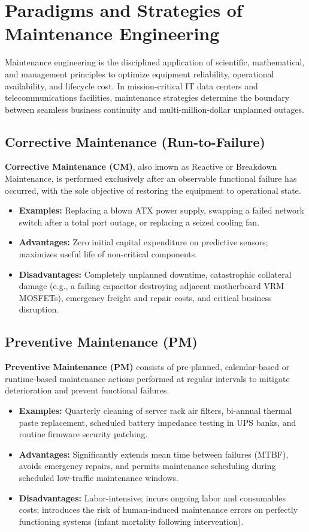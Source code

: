 \section{Paradigms and Strategies of Maintenance Engineering}

Maintenance engineering is the disciplined application of scientific, mathematical, and management principles to optimize equipment reliability, operational availability, and lifecycle cost. In mission-critical IT data centers and telecommunications facilities, maintenance strategies determine the boundary between seamless business continuity and multi-million-dollar unplanned outages.

\subsection{Corrective Maintenance (Run-to-Failure)}
\textbf{Corrective Maintenance (CM)}, also known as Reactive or Breakdown Maintenance, is performed exclusively after an observable functional failure has occurred, with the sole objective of restoring the equipment to operational state.
\begin{itemize}[leftmargin=*]
    \item \textbf{Examples:} Replacing a blown ATX power supply, swapping a failed network switch after a total port outage, or replacing a seized cooling fan.
    \item \textbf{Advantages:} Zero initial capital expenditure on predictive sensors; maximizes useful life of non-critical components.
    \item \textbf{Disadvantages:} Completely unplanned downtime, catastrophic collateral damage (e.g., a failing capacitor destroying adjacent motherboard VRM MOSFETs), emergency freight and repair costs, and critical business disruption.
\end{itemize}

\subsection{Preventive Maintenance (PM)}
\textbf{Preventive Maintenance (PM)} consists of pre-planned, calendar-based or runtime-based maintenance actions performed at regular intervals to mitigate deterioration and prevent functional failures.
\begin{itemize}[leftmargin=*]
    \item \textbf{Examples:} Quarterly cleaning of server rack air filters, bi-annual thermal paste replacement, scheduled battery impedance testing in UPS banks, and routine firmware security patching.
    \item \textbf{Advantages:} Significantly extends mean time between failures (MTBF), avoids emergency repairs, and permits maintenance scheduling during scheduled low-traffic maintenance windows.
    \item \textbf{Disadvantages:} Labor-intensive; incurs ongoing labor and consumables costs; introduces the risk of human-induced maintenance errors on perfectly functioning systems (infant mortality following intervention).
\end{itemize}

